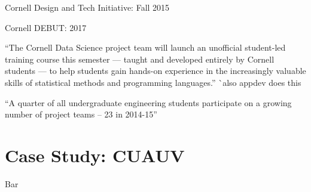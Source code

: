 \documentclass[12pt]{article}
\begin{document}
Cornell Design and Tech Initiative: Fall 2015
\cite{noauthor_cornell_2018-3}

Cornell DEBUT: 2017
\cite{noauthor_cornell_2018-4}




``The Cornell Data Science project team will launch an unofficial student-led training course this semester — taught and developed entirely by Cornell students — to help students gain hands-on experience in the increasingly valuable skills of statistical methods and programming languages.''
\cite{si_cornell_2017}
^^ also appdev does this

``A quarter of all undergraduate engineering students participate on a growing number of project teams -- 23 in 2014-15''
\cite{klein_engineering_2015}

\cite{emily_hopkins_10_2012}
\cite{noauthor_q&rebecca_2014}

\section{Case Study: CUAUV}
Bar



\end{document}
